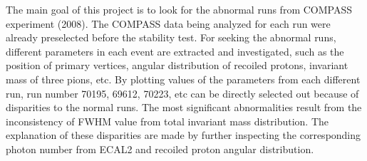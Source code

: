 The main goal of this project is to look for the abnormal runs from COMPASS experiment (2008). The COMPASS data being analyzed for each run were already preselected before the stability test. For seeking the abnormal runs, different parameters in each event are extracted and investigated, such as the position of primary vertices, angular distribution of recoiled protons, invariant mass of three pions, etc. By plotting values of the parameters from each different run, run number 70195, 69612, 70223, etc can be directly selected out because of disparities to the normal runs. The most significant abnormalities result from the inconsistency of FWHM value from total invariant mass distribution. The explanation of these disparities are made by further inspecting the corresponding photon number from ECAL2 and recoiled proton angular distribution.
\newline
\newline
\newline

